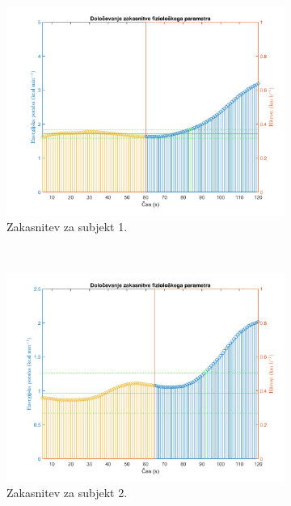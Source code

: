 \begin{figure}[!htbp]
	\centering
	\begin{subfigure}[t]{0.45\columnwidth}
		\includegraphics[width=\columnwidth]{./Slike/lag-estimation-1-eem.png}
		\caption{Zakasnitev za subjekt 1.}
		\label{fig:lag-estimation-1-eem}
	\end{subfigure}
	~
	\begin{subfigure}[t]{0.45\columnwidth}
		\includegraphics[width=\columnwidth]{./Slike/lag-estimation-2-eem.png}
		\caption{Zakasnitev za subjekt 2.}
		\label{fig:lag-estimation-2-eem}
	\end{subfigure}
	~
	\begin{subfigure}[t]{0.45\columnwidth}

\end{subfigure}
\end{figure}
